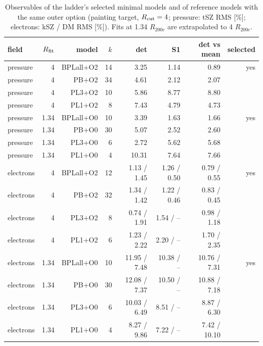 \documentclass[10pt,a4paper]{article}
\begin{document}
\begin{table}[H]
\centering
\footnotesize
\caption{Observables of the ladder's selected minimal models and of reference models with the same outer option (painting target, $R_{\rm cut}=4$; pressure: tSZ RMS [\%]; electrons: kSZ / DM RMS [\%]). Fits at 1.34 $R_{200c}$ are extrapolated to 4 $R_{200c}$.}
\label{tab:selobs}
\begin{tabular}{lrrrrrrr}
\toprule
field & $R_{\rm fit}$ & model & $k$ & det & S1 & det vs mean & selected \\
\midrule
pressure & 4 & BPLall+O2 & 14 & 3.25 & 1.14 & 0.89 & yes \\
pressure & 4 & PB+O2 & 34 & 4.61 & 2.12 & 2.07 &  \\
pressure & 4 & PL3+O2 & 10 & 5.86 & 8.77 & 8.80 &  \\
pressure & 4 & PL1+O2 & 8 & 7.43 & 4.79 & 4.73 &  \\
pressure & 1.34 & BPLall+O0 & 10 & 3.39 & 1.63 & 1.66 & yes \\
pressure & 1.34 & PB+O0 & 30 & 5.07 & 2.52 & 2.60 &  \\
pressure & 1.34 & PL3+O0 & 6 & 2.72 & 5.62 & 5.68 &  \\
pressure & 1.34 & PL1+O0 & 4 & 10.31 & 7.64 & 7.66 &  \\
electrons & 4 & BPLall+O2 & 12 & 1.13 / 1.45 & 1.26 / 0.50 & 0.79 / 0.55 & yes \\
electrons & 4 & PB+O2 & 32 & 1.34 / 1.42 & 1.22 / 0.46 & 0.83 / 0.45 &  \\
electrons & 4 & PL3+O2 & 8 & 0.74 / 1.91 & 1.54 / -- & 0.98 / 1.18 &  \\
electrons & 4 & PL1+O2 & 6 & 1.23 / 2.22 & 2.20 / -- & 1.70 / 2.35 &  \\
electrons & 1.34 & BPLall+O0 & 10 & 11.95 / 7.48 & 10.38 / -- & 10.76 / 7.31 & yes \\
electrons & 1.34 & PB+O0 & 30 & 12.08 / 7.37 & 10.50 / -- & 10.88 / 7.18 &  \\
electrons & 1.34 & PL3+O0 & 6 & 10.03 / 6.49 & 8.51 / -- & 8.87 / 6.30 &  \\
electrons & 1.34 & PL1+O0 & 4 & 8.27 / 9.86 & 7.22 / -- & 7.42 / 10.10 &  \\
\bottomrule
\end{tabular}
\end{table}
\end{document}
